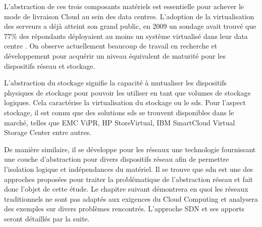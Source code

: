 L'abstraction de ces trois composants matériels est essentielle pour achever le mode de livraison Cloud au sein des data centres. L'adoption de la virtualisation des serveurs a déjà atteint son grand public, en 2009 un sondage avait trouvé que 77\% des répondants déployaient au moins un système virtualisé dans leur data centre \cite{x86ServersVirtualization}. On observe actuellement beaucoup de travail en recherche et développement pour acquérir un niveau équivalent de maturité pour les dispositifs réseau et stockage. 

L'abstraction du stockage signifie la capacité à mutualiser les dispositifs physiques de stockage pour pouvoir les utiliser en tant que volumes de stockage logiques. Cela caractérise la virtualisation du stockage ou le \gls{sds}. Pour l'aspect stockage, il est connu que des solutions \gls{sds} se trouvent disponibles dans le marché, telles que EMC ViPR, HP StoreVirtual, IBM SmartCloud Virtual Storage Center entre autres.

De manière similaire, il se développe pour les réseaux une technologie fournissant une couche d'abstraction pour divers dispositifs réseau afin de permettre l'isolation logique et indépendances du matériel. Il se trouve que \gls{sdn} est une des approches proposées pour traiter la problématique de l'abstraction réseau et fait donc l'objet de cette étude. Le chapitre suivant démontrera en quoi les réseaux traditionnels ne sont pas adaptés aux exigences du Cloud Computing et analysera des exemples sur divers problèmes rencontrés. L'approche SDN et ses apports seront détaillés par la suite.
\cite{ibmPlanningVirtCCchap1}  \cite{cloudReadyJuniperReferenceDef} \cite{journeySDDC} \cite{ciscoCCDCStrategyArchiSolutions}

